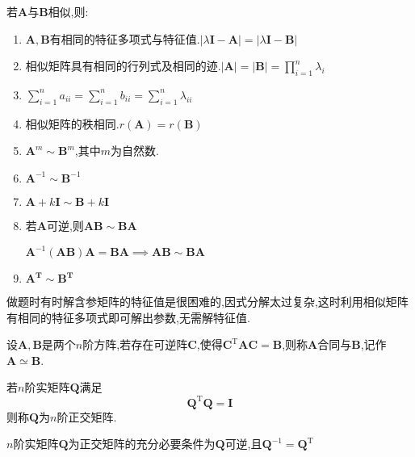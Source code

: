 若$\mathbf{A}$与$\mathbf{B}$相似,则: 
\begin{enumerate}
    \item $\mathbf{A},\mathbf{B}$有相同的特征多项式与特征值.$\left\lvert \lambda\mathbf{I}-\mathbf{A}\right\rvert =\left\lvert \lambda\mathbf{I}-\mathbf{B}\right\rvert $
    \item 相似矩阵具有相同的行列式及相同的迹.$\left\lvert \mathbf{A}\right\rvert =\left\lvert \mathbf{B}\right\rvert =\prod ^n_{i=1}\lambda_i$
    \item $\sum_{i=1}^{n} a_{ii}=\sum_{i=1}^{n} b_{ii}=\sum_{i=1}^{n} \lambda_{ii}$
    \item 相似矩阵的秩相同.$r(\mathbf{A})=r(\mathbf{B})$
    \item $\mathbf{A}^m\sim \mathbf{B}^m$,其中$m$为自然数.
    \item $\mathbf{A}^{-1}\sim \mathbf{B}^{-1}$
    \item $\mathbf{A}+k\mathbf{I}\sim \mathbf{B}+k\mathbf{I}$
    \item 若$\mathbf{A}$可逆,则$\mathbf{A}\mathbf{B}\sim\mathbf{B}\mathbf{A}$
    
    \zheng $\mathbf{A}^{-1}(\mathbf{A}\mathbf{B})\mathbf{A}=\mathbf{B}\mathbf{A} \implies \mathbf{A}\mathbf{B}\sim\mathbf{B}\mathbf{A}$

    \item $\mathbf{A}^\mathbf{T}\sim \mathbf{B}^\mathbf{T}$
\end{enumerate}

做题时有时解含参矩阵的特征值是很困难的,因式分解太过复杂,这时利用相似矩阵有相同的特征多项式即可解出参数,无需解特征值.

\begin{definition}
    设$\mathbf{A},\mathbf{B}$是两个$n$阶方阵,若存在可逆阵$\mathbf{C}$,使得$\mathbf{C}^\mathrm{T}\mathbf{A}\mathbf{C}=\mathbf{B}$,则称$\mathbf{A}$合同与$\mathbf{B}$,记作$\mathbf{A}\simeq \mathbf{B}$.
\end{definition}

\begin{definition}
    若$n$阶实矩阵$\mathbf{Q}$满足
    \begin{equation*}
        \mathbf{Q}^\mathrm{T}\mathbf{Q}=\mathbf{I}
    \end{equation*}
    则称$\mathbf{Q}$为$n$阶正交矩阵.
\end{definition}

\begin{ttheorem}
    $n$阶实矩阵$\mathbf{Q}$为正交矩阵的充分必要条件为$\mathbf{Q}$可逆,且$\mathbf{Q}^{-1}=\mathbf{Q}^\mathrm{T}$
\end{ttheorem}

